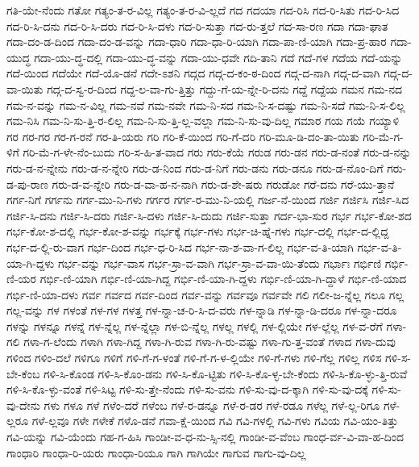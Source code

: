 {ಗತಿ-ಯೇ-ನೆಂದು
ಗತೋ
ಗತ್ಯಂ-ತ-ರ-ವಿಲ್ಲ
ಗತ್ಯಂ-ತ-ರ-ವಿ-ಲ್ಲದೆ
ಗದ
ಗದಯಾ
ಗದ-ರಿಸಿ
ಗದ-ರಿ-ಸಿತು
ಗದ-ರಿ-ಸಿದ
ಗದ-ರಿ-ಸಿ-ದನು
ಗದ-ರಿ-ಸಿ-ದರು
ಗದ-ರಿ-ಸಿ-ದಳು
ಗದ-ರಿ-ಸುತ್ತಾ
ಗದ-ರು-ತ್ತಲೆ
ಗದ-ಸಾ-ರಣ
ಗದಾ
ಗದಾ-ಘಾತ
ಗದಾ-ದಂ-ಡ-ದಿಂದ
ಗದಾ-ದಂ-ಡ-ವನ್ನು
ಗದಾ-ಧಾರಿ
ಗದಾ-ಧಾ-ರಿ-ಯಾಗಿ
ಗದಾ-ಪಾ-ಣಿ-ಯಾಗಿ
ಗದಾ-ಪ್ರ-ಹಾರ
ಗದಾ-ಯುದ್ಧ
ಗದಾ-ಯು-ದ್ಧ-ದಲ್ಲಿ
ಗದಾ-ಯು-ದ್ಧ-ವನ್ನು
ಗದಾ-ಯು-ಧವೇ
ಗದಿ-ತಾನಿ
ಗದೆ
ಗದೆ-ಗಳ
ಗದೆಯ
ಗದೆ-ಯನ್ನು
ಗದೆ-ಯಿಂದ
ಗದೆಯೇ
ಗದೆ-ಯೊ-ಡನೆ
ಗದೇ-ಽಶನಿ
ಗದ್ಗದ
ಗದ್ಗ-ದ-ಕಂ-ಠ-ದಿಂದ
ಗದ್ಗ-ದ-ನಾಗಿ
ಗದ್ಗ-ದ-ವಾಗಿ
ಗದ್ಗ-ದ-ವಾ-ಯಿತು
ಗದ್ಗ-ದ-ಸ್ವ-ರ-ದಿಂದ
ಗದ್ದ-ಲ-ವಾ-ಗು-ತ್ತಿತ್ತು
ಗದ್ದು-ಗೆ-ಯ-ನ್ನೇ-ರಿ-ದನು
ಗದ್ದೆ
ಗದ್ದೆಯ
ಗಮನ
ಗಮ-ನದ
ಗಮ-ನ-ವನ್ನು
ಗಮ-ನ-ವಿಲ್ಲ
ಗಮ-ನವೆ
ಗಮ-ನವೇ
ಗಮ-ನಿ-ಸದ
ಗಮ-ನಿ-ಸ-ದಷ್ಟು
ಗಮ-ನಿ-ಸದೆ
ಗಮ-ನಿ-ಸ-ಲಿಲ್ಲ
ಗಮ-ನಿಸಿ
ಗಮ-ನಿ-ಸು-ತ್ತಿ-ರ-ಲಿಲ್ಲ
ಗಮ-ನಿ-ಸು-ತ್ತಿ-ಲ್ಲ-ವಲ್ಲಾ
ಗಮ-ನಿ-ಸು-ವು-ದಿಲ್ಲ
ಗಮಾರ
ಗಯ
ಗಯೆ
ಗಯ್ಯಾಳಿ
ಗರ
ಗರ-ಗರ
ಗರ-ಗ-ರನೆ
ಗರ-ತಿ-ಯರು
ಗರಿ
ಗರಿ-ಕೆ-ಯಿಂದ
ಗರಿ-ಗೆ-ದರಿ
ಗರಿ-ಮೂ-ಡಿ-ದಂ-ತಾ-ಯಿತು
ಗರಿ-ಮೆ-ಗ-ಳಿಗೆ
ಗರಿ-ಮೆ-ಗ-ಳೇ-ನೆಂ-ಬುದು
ಗರಿ-ಸ-ಹಿ-ತ-ವಾದ
ಗರು
ಗರು-ಕೆಯೆ
ಗರುಡ
ಗರು-ಡನ
ಗರು-ಡ-ನಂತೆ
ಗರು-ಡ-ನನ್ನು
ಗರು-ಡ-ನ-ನ್ನೇನು
ಗರು-ಡ-ನ-ನ್ನೇರಿ
ಗರು-ಡ-ನಿಂದ
ಗರು-ಡ-ನಿಗೆ
ಗರು-ಡನು
ಗರು-ಡನೂ
ಗರು-ಡ-ನೊಂ-ದಿಗೆ
ಗರು-ಡ-ಪು-ರಾಣ
ಗರು-ಡ-ವ-ನ್ನೇರಿ
ಗರು-ಡ-ವಾ-ಹ-ನ-ನಾಗಿ
ಗರು-ಡ-ಶೇ-ಷರು
ಗರುಡೋ
ಗರೆ-ದನು
ಗರೆ-ಯು-ತ್ತಾನೆ
ಗರ್ಗ-ನಿಗೆ
ಗರ್ಗನು
ಗರ್ಗ-ಮು-ನಿ-ಗಳು
ಗರ್ಗರ
ಗರ್ಗ-ರ-ಮು-ನಿ-ಯಲ್ಲಿ
ಗರ್ಜ-ನೆ-ಯಿಂದ
ಗರ್ಜಿ
ಗರ್ಜಿಸಿ
ಗರ್ಜಿ-ಸಿದ
ಗರ್ಜಿ-ಸಿ-ದನು
ಗರ್ಜಿ-ಸಿ-ದರು
ಗರ್ಜಿ-ಸಿ-ದಳು
ಗರ್ಜಿ-ಸಿ-ದುದು
ಗರ್ಜಿ-ಸುತ್ತಾ
ಗರ್ದ-ಭಾ-ಸುರ
ಗರ್ಭ
ಗರ್ಭ-ಕೋ-ಶದ
ಗರ್ಭ-ಕೋ-ಶ-ದಲ್ಲಿ
ಗರ್ಭ-ಕೋ-ಶ-ವನ್ನು
ಗರ್ಭಕ್ಕೆ
ಗರ್ಭ-ಗಳು
ಗರ್ಭ-ಚಿ-ಹ್ನೆ-ಗಳು
ಗರ್ಭ-ದಲ್ಲಿ
ಗರ್ಭ-ದ-ಲ್ಲಿದ್ದ
ಗರ್ಭ-ದ-ಲ್ಲಿ-ರು-ವಾಗ
ಗರ್ಭ-ದಿಂದ
ಗರ್ಭ-ಧ-ರಿ-ಸಿದ
ಗರ್ಭ-ನಾ-ಶ-ವಾ-ಗ-ಲಿಲ್ಲ
ಗರ್ಭ-ವ-ತಿ-ಯಾಗಿ
ಗರ್ಭ-ವ-ತಿ-ಯಾ-ಗಿ-ದ್ದಳು
ಗರ್ಭ-ವನ್ನು
ಗರ್ಭ-ವಾಸ
ಗರ್ಭ-ಸ್ರಾ-ವ-ವಾಗಿ
ಗರ್ಭ-ಸ್ರಾ-ವ-ವಾ-ಯಿ-ತೆಂದು
ಗರ್ಭಾಃ
ಗರ್ಭಿಣಿ
ಗರ್ಭಿ-ಣಿ-ಯರ
ಗರ್ಭಿ-ಣಿ-ಯಾಗಿ
ಗರ್ಭಿ-ಣಿ-ಯಾ-ಗಿದ್ದ
ಗರ್ಭಿ-ಣಿ-ಯಾ-ಗಿ-ದ್ದಳು
ಗರ್ಭಿ-ಣಿ-ಯಾ-ಗಿ-ದ್ದಾಳೆ
ಗರ್ಭಿ-ಣಿ-ಯಾದ
ಗರ್ಭಿ-ಣಿ-ಯಾ-ದಳು
ಗರ್ವ
ಗರ್ವದ
ಗರ್ವ-ದಿಂದ
ಗರ್ವ-ವನ್ನು
ಗರ್ವವೂ
ಗರ್ವವೇ
ಗಲಿ
ಗಲೀ-ಜ-ನ್ನೆಲ್ಲ
ಗಲೂ
ಗಲ್ಲ
ಗಲ್ಲ-ವನ್ನು
ಗಳ
ಗಳಂತೆ
ಗಳ-ಗಳ
ಗಳತ್ತ
ಗಳ-ನ್ನಾ-ಚ-ರಿ-ಸಿ-ದ-ವರು
ಗಳ-ನ್ನಾಡಿ
ಗಳ-ನ್ನಾ-ಡಿ-ದರೂ
ಗಳ-ನ್ನಾ-ದರೂ
ಗಳನ್ನು
ಗಳನ್ನೂ
ಗಳನ್ನೆ
ಗಳ-ನ್ನೆಲ್ಲ
ಗಳ-ನ್ನೆಲ್ಲಾ
ಗಳ-ಬಿ-ನ್ನೆಲ್ಲ
ಗಳಲ್ಲ
ಗಳಲ್ಲಿ
ಗಳ-ಲ್ಲಿಯೇ
ಗಳ-ಲ್ಲೆಲ್ಲ
ಗಳ-ವ-ರೆಗೆ
ಗಳಾ-ಗಲಿ
ಗಳಾ-ಗ-ಲೆಂದು
ಗಳಾಗಿ
ಗಳಾ-ಗಿದ್ದ
ಗಳಾ-ಗಿ-ರುವ
ಗಳಾ-ಗಿ-ರು-ವಷ್ಟು
ಗಳಾ-ಗು-ತ್ತ-ವಂತೆ
ಗಳಾದ
ಗಳಾ-ದುವು
ಗಳಿಂದ
ಗಳಿಂ-ದಲೆ
ಗಳಿಗೂ
ಗಳಿಗೆ
ಗಳಿ-ಗೆ-ಗ-ಳಂತೆ
ಗಳಿ-ಗೆ-ಗ-ಳ-ಲ್ಲಿಯೇ
ಗಳಿ-ಗೆ-ಗಳು
ಗಳಿ-ಗೆಲ್ಲ
ಗಳಿಲ್ಲ
ಗಳಿಸ
ಗಳಿ-ಸ-ಬೇ-ಕೆಂಬ
ಗಳಿ-ಸಿ-ಕೊಂಡ
ಗಳಿ-ಸಿ-ಕೊಂ-ಡನು
ಗಳಿ-ಸಿ-ಕೊ-ಟ್ಟಿತು
ಗಳಿ-ಸಿ-ಕೊ-ಳ್ಳ-ಬೇ-ಕೆಂದು
ಗಳಿ-ಸಿ-ಕೊ-ಳ್ಳು-ತ್ತಿ-ರುವೆ
ಗಳಿ-ಸಿ-ಕೊ-ಳ್ಳು-ವಂತೆ
ಗಳಿ-ಸಿಟ್ಟ
ಗಳಿ-ಸು-ತ್ತೇ-ನೆಂದು
ಗಳಿ-ಸು-ವನು
ಗಳಿ-ಸು-ವು-ದ-ಕ್ಕಾಗಿ
ಗಳಿ-ಸು-ವು-ದಕ್ಕೆ
ಗಳಿ-ಸು-ವು-ದೇನು
ಗಳು
ಗಳೂ
ಗಳೆ
ಗಳೆಂ-ದರೆ
ಗಳೆಂಬ
ಗಳೆ-ರ-ಡನ್ನೂ
ಗಳೆ-ರ-ಡರ
ಗಳೆ-ರಡೂ
ಗಳೆಲ್ಲ
ಗಳೆ-ಲ್ಲ-ರಿಗೂ
ಗಳೆ-ಲ್ಲರೂ
ಗಳೆ-ಲ್ಲವೂ
ಗಳೇ
ಗಳೇಕೆ
ಗಳೊ-ಡನೆ
ಗವಾ-ಕ್ಷೆ-ಯಿಂದ
ಗವಿ
ಗವಿ-ಗಳಲ್ಲಿ
ಗವಿ-ಗಳು
ಗವಿಯ
ಗವಿ-ಯಂ-ತಿತ್ತು
ಗವಿ-ಯನ್ನು
ಗವಿ-ಯೆಂದು
ಗಹ-ಗ-ಹಿಸಿ
ಗಾಂಡೀ-ವ-ಧ-ನು-ಸ್ಸಿ-ನಲ್ಲಿ
ಗಾಂಡೀ-ವ-ವೆಂಬ
ಗಾಂಧ-ರ್ವ-ವಿ-ವಾ-ಹ-ದಿಂದ
ಗಾಂಧಾರಿ
ಗಾಂಧಾ-ರಿ-ಯರು
ಗಾಂಧಾ-ರಿಯೂ
ಗಾಗಿ
ಗಾಗಿಯೇ
ಗಾಗುವ
ಗಾಗು-ವು-ದಿಲ್ಲ
}
